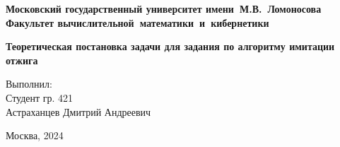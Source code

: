 \begin{titlepage}


\begin{center}
\large{\textbf{Московский государственный университет имени~М.В.~Ломоносова}}\\
\hfill \break
\large{\textbf{Факультет вычислительной~математики~и~кибернетики}}\\
\vspace{6cm}

{\bf\LARGE Теоретическая постановка задачи для задания по алгоритму имитации
    отжига}\\
\vspace{1cm}

\end{center}
\vspace{3cm}
\begin{flushright}

Выполнил:\\
Студент гр. 421\\
Астраханцев Дмитрий Андреевич\\

\end{flushright}

\vfill
\centerline {\large{Москва, 2024}}

\end{titlepage}
\newpage
